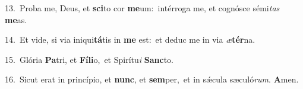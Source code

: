 {\numbfont\textcolor{\numbcolor}{13.}}~Proba me, Deus, et \textbf{sci}\-to cor \textbf{me}\-um:~\star intérroga me, et cognósce sémi\textit{tas} \textbf{me}\-as.\par
{\numbfont\textcolor{\numbcolor}{14.}}~Et vide, si via iniqui\-\textbf{tá}\-tis in \textbf{me} est:~\star et deduc me in via \textit{æ}\-\textbf{tér}na.\par
{\numbfont\textcolor{\numbcolor}{15.}}~Glória \textbf{Pa}\-tri, et \textbf{Fí}\-\textbf{li}o,~\star et Spirítu\textit{i} \textbf{Sanc}\-to.\par
{\numbfont\textcolor{\numbcolor}{16.}}~Sicut erat in princípio, et \textbf{nunc}\-, et \textbf{sem}\-per,~\star et in sǽcula sæculó\-\textit{rum}\-. \textbf{A}\-men.\par
